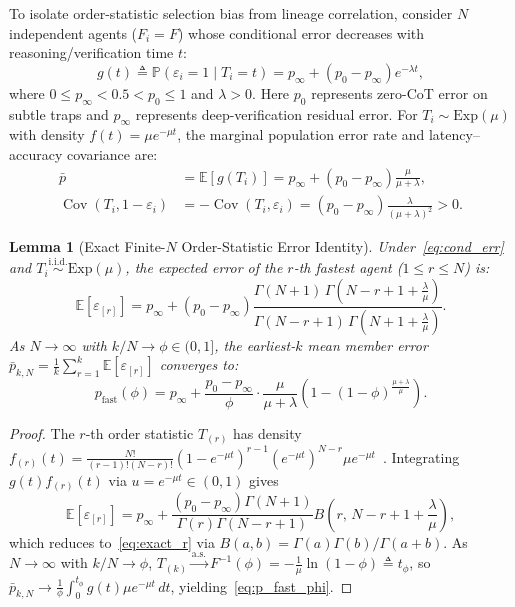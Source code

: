 \documentclass[conference]{IEEEtran}
\newtheorem{lemma}{Lemma}
\theoremstyle{definition}
\theoremstyle{remark}
\newcommand{\Cov}{\operatorname{Cov}}
\newcommand{\Prob}{\mathbb{P}}
\newcommand{\E}{\mathbb{E}}
\begin{document}
To isolate order-statistic selection bias from lineage correlation, consider $N$ independent agents ($F_i = F$) whose conditional error decreases with reasoning/verification time $t$:
\begin{equation}\label{eq:cond_err}
  g(t) \triangleq \Prob(\varepsilon_i = 1 \mid T_i = t) = p_\infty + (p_0 - p_\infty)e^{-\lambda t},
\end{equation}
where $0 \le p_\infty < 0.5 < p_0 \le 1$ and $\lambda > 0$. Here $p_0$ represents zero-CoT error on subtle traps and $p_\infty$ represents deep-verification residual error. For $T_i \sim \mathrm{Exp}(\mu)$ with density $f(t) = \mu e^{-\mu t}$, the marginal population error rate and latency--accuracy covariance are:
\begin{align}
  \bar{p} &= \E[g(T_i)] = p_\infty + (p_0 - p_\infty)\frac{\mu}{\mu + \lambda}, \label{eq:pbar} \\
  \Cov(T_i, 1 - \varepsilon_i) &= -\Cov(T_i, \varepsilon_i) = (p_0 - p_\infty)\frac{\lambda}{(\mu + \lambda)^2} > 0. \label{eq:cov_exact}
\end{align}

\begin{lemma}[Exact Finite-$N$ Order-Statistic Error Identity]\label{lem:finite_n}
Under~\eqref{eq:cond_err} and $T_i \stackrel{\mathrm{i.i.d.}}{\sim} \mathrm{Exp}(\mu)$, the expected error of the $r$-th fastest agent ($1 \le r \le N$) is:
\begin{equation}\label{eq:exact_r}
  \E[\varepsilon_{[r]}] = p_\infty + (p_0 - p_\infty)\frac{\Gamma(N + 1)\,\Gamma\!\left(N - r + 1 + \frac{\lambda}{\mu}\right)}{\Gamma(N - r + 1)\,\Gamma\!\left(N + 1 + \frac{\lambda}{\mu}\right)}.
\end{equation}
As $N \to \infty$ with $k / N \to \phi \in (0, 1]$, the earliest-$k$ mean member error $\bar{p}_{k,N} = \frac{1}{k}\sum_{r=1}^k \E[\varepsilon_{[r]}]$ converges to:
\begin{equation}\label{eq:p_fast_phi}
  p_{\mathrm{fast}}(\phi) = p_\infty + \frac{p_0 - p_\infty}{\phi}\cdot\frac{\mu}{\mu + \lambda}\!\left(1 - (1 - \phi)^{\frac{\mu + \lambda}{\mu}}\right).
\end{equation}
\end{lemma}

\begin{proof}
The $r$-th order statistic $T_{(r)}$ has density $f_{(r)}(t) = \frac{N!}{(r-1)!(N-r)!}(1 - e^{-\mu t})^{r-1}(e^{-\mu t})^{N-r}\mu e^{-\mu t}$~\cite{david2003order}. Integrating $g(t)f_{(r)}(t)$ via $u = e^{-\mu t} \in (0, 1)$ gives
\[
  \E[\varepsilon_{[r]}] = p_\infty + \frac{(p_0 - p_\infty)\Gamma(N+1)}{\Gamma(r)\Gamma(N-r+1)} B\!\left(r,\, N - r + 1 + \frac{\lambda}{\mu}\right),
\]
which reduces to~\eqref{eq:exact_r} via $B(a, b) = \Gamma(a)\Gamma(b)/\Gamma(a+b)$. As $N \to \infty$ with $k/N \to \phi$, $T_{(k)} \xrightarrow{\mathrm{a.s.}} F^{-1}(\phi) = -\frac{1}{\mu}\ln(1 - \phi) \triangleq t_\phi$, so $\bar{p}_{k,N} \to \frac{1}{\phi}\int_0^{t_\phi} g(t)\mu e^{-\mu t}\,dt$, yielding~\eqref{eq:p_fast_phi}.
\end{proof}
\end{document}
